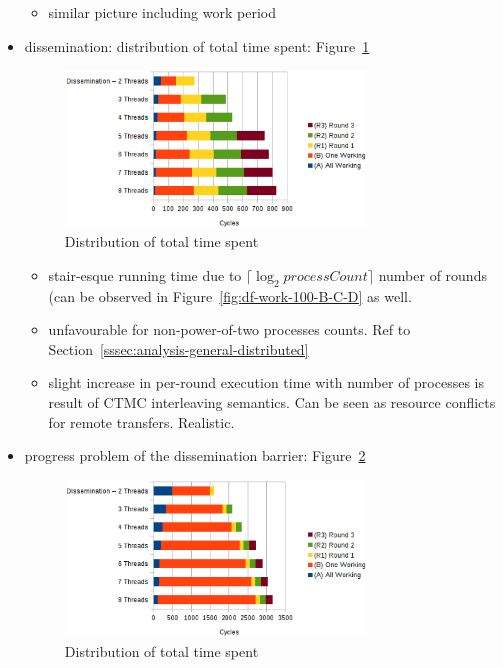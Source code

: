 \documentclass[a4paper, 10pt]{article}
\begin{document}
\begin{itemize}
		\begin{itemize}
			\item similar picture including work period
		\end{itemize}
	\item dissemination: distribution of total time spent: Figure~\ref{fig:d-work-100-partition}
		\begin{figure}[htbp]
			\centering
			\includegraphics[width=8cm]{charts/d-work-100-partition}
			\caption{Distribution of total time spent}
			\label{fig:d-work-100-partition}
		\end{figure}
		\begin{itemize}
			\item stair-esque running time due to $\lceil \log_2 \mathit{processCount} \rceil$ number of rounds (can be observed in Figure~\ref{fig:df-work-100-B-C-D} as well.
			\item unfavourable for non-power-of-two processes counts. Ref to Section~\ref{sssec:analysis-general-distributed}
			\item slight increase in per-round execution time with number of processes is result of CTMC interleaving semantics. Can be seen as resource conflicts for remote transfers. Realistic.
		\end{itemize}
	\item progress problem of the dissemination barrier: Figure~\ref{fig:d-work-1000-partition}
		\begin{figure}[htbp]
			\centering
			\includegraphics[width=8cm]{charts/d-work-1000-partition}
			\caption{Distribution of total time spent}
			\label{fig:d-work-1000-partition}
		\end{figure}
		\begin{itemize}

\end{itemize}
\end{itemize}
\end{document}
